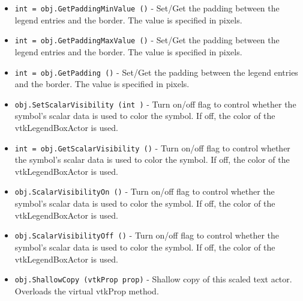 \begin{itemize}
\item  \verb|int = obj.GetPaddingMinValue ()| -  Set/Get the padding between the legend entries and the border. The value
 is specified in pixels.

\item  \verb|int = obj.GetPaddingMaxValue ()| -  Set/Get the padding between the legend entries and the border. The value
 is specified in pixels.

\item  \verb|int = obj.GetPadding ()| -  Set/Get the padding between the legend entries and the border. The value
 is specified in pixels.

\item  \verb|obj.SetScalarVisibility (int )| -  Turn on/off flag to control whether the symbol's scalar data
 is used to color the symbol. If off, the color of the 
 vtkLegendBoxActor is used.

\item  \verb|int = obj.GetScalarVisibility ()| -  Turn on/off flag to control whether the symbol's scalar data
 is used to color the symbol. If off, the color of the 
 vtkLegendBoxActor is used.

\item  \verb|obj.ScalarVisibilityOn ()| -  Turn on/off flag to control whether the symbol's scalar data
 is used to color the symbol. If off, the color of the 
 vtkLegendBoxActor is used.

\item  \verb|obj.ScalarVisibilityOff ()| -  Turn on/off flag to control whether the symbol's scalar data
 is used to color the symbol. If off, the color of the 
 vtkLegendBoxActor is used.

\item  \verb|obj.ShallowCopy (vtkProp prop)| -  Shallow copy of this scaled text actor. Overloads the virtual
 vtkProp method.

\end{itemize}
